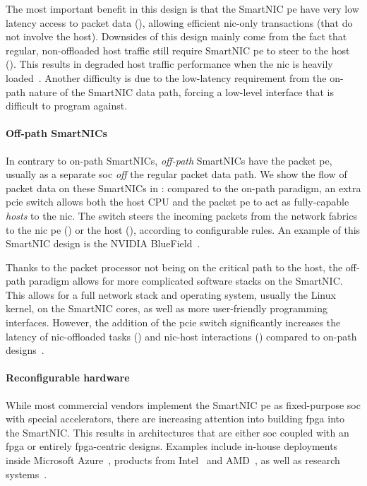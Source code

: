 The most important benefit in this design is that the SmartNIC \ac{pe} have very low latency access to packet data (), allowing efficient \ac{nic}-only transactions (that do not involve the host).  Downsides of this design mainly come from the fact that regular, non-offloaded host traffic still require SmartNIC \ac{pe} to steer to the host ().  This results in degraded host traffic performance when the \ac{nic} is heavily loaded~\cite{liu_offloading_2019}.  Another difficulty is due to the low-latency requirement from the on-path nature of the SmartNIC data path, forcing a low-level interface that is difficult to program against.

\paragraph{Off-path SmartNICs} In contrary to on-path SmartNICs, \emph{off-path} SmartNICs have the packet \ac{pe}, usually as a separate \ac{soc} \emph{off} the regular packet data path.  We show the flow of packet data on these SmartNICs in : compared to the on-path paradigm, an extra \ac{pcie} switch allows both the host CPU and the packet \ac{pe} to act as fully-capable \emph{hosts} to the \ac{nic}.  The switch steers the incoming packets from the network fabrics to the \ac{nic} \ac{pe} () or the host (), according to configurable rules.  An example of this SmartNIC design is the NVIDIA BlueField~\cite{nvidia_corporation_nvidia_2021}.

Thanks to the packet processor not being on the critical path to the host, the off-path paradigm allows for more complicated software stacks on the SmartNIC.  This allows for a full network stack and operating system, usually the Linux kernel, on the SmartNIC cores, as well as more user-friendly programming interfaces.  However, the addition of the \ac{pcie} switch significantly increases the latency of \ac{nic}-offloaded tasks () and \ac{nic}-host interactions () compared to on-path designs~\cite{wei_characterizing_2023}.

\paragraph{Reconfigurable hardware} While most commercial vendors implement the SmartNIC \ac{pe} as fixed-purpose \ac{soc} with special accelerators, there are increasing attention into building \ac{fpga} into the SmartNIC.  This results in architectures that are either \ac{soc} coupled with an \ac{fpga} or entirely \ac{fpga}-centric designs.  Examples include in-house deployments inside Microsoft Azure~\cite{firestone_azure_2018}, products from Intel~\cite{intel_intel_nodate} and AMD~\cite{xilinx_alveo_2020, xilinx_alveo_2022}, as well as research systems~\cite{wang_fpganic_2022, khazraee_rosebud_2023}.

